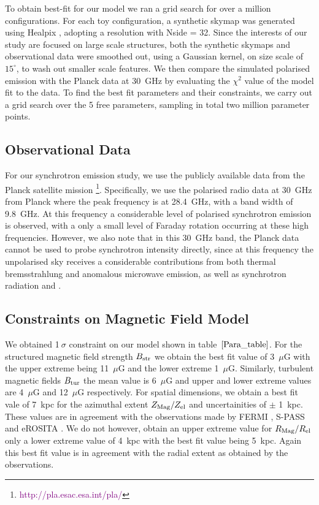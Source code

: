 \documentclass[usenatbib]{mnras}
\begin{document}

To obtain best-fit for our model we ran a grid search for over a million configurations. For each toy configuration, a synthetic skymap was generated using Healpix \cite{Healpix_2005}, adopting a resolution with Nside = 32. Since the interests of our study are focused on large scale structures, both the synthetic skymaps and observational data were smoothed out, using a Gaussian kernel, on size scale of $15^{\circ}$, to wash out smaller scale features. We then compare the simulated polarised emission with the Planck data at 30~GHz by evaluating the $\chi^{2}$ value of the model fit to the data. To find the best fit parameters and their constraints, we carry out a grid search over the 5 free parameters, sampling in total two million parameter points.


\subsection{Observational Data}
For our synchrotron emission study, we use the publicly available data from the Planck satellite mission \footnote{\textcolor{purple}{http://pla.esac.esa.int/pla/}}. Specifically, we use the polarised radio data at 30~GHz from Planck where the peak frequency is at 28.4~GHz, with a band width of 9.8~GHz. At this frequency a considerable level of polarised synchrotron emission is observed, with a only a small level of Faraday rotation occurring at these high frequencies. However, we also note that in this 30~GHz band, the Planck data cannot be used to probe synchrotron intensity directly, since at this frequency the unpolarised sky receives a considerable contributions from both thermal bremsstrahlung and anomalous microwave emission, as well as synchrotron radiation \cite{Planck_XIX} and \cite{Planck_XLII}. 

\subsection{Constraints on Magnetic Field Model}
\label{Results}
We obtained 1$~\sigma$ constraint on our model shown in table~$\ref{Para_table}$. For the structured magnetic field strength $B_{\rm str}$ we obtain the best fit value of 3~$\mu$G with the upper extreme being 11~$\mu$G
and the lower extreme 1~$\mu$G. Similarly, turbulent magnetic fields $B_{\rm tur}$ the mean value is 6~$\mu$G and upper and lower extreme values are 4~$\mu$G and 12~$\mu$G respectively. For spatial dimensions, we obtain a best fit vale of 7~kpc for the azimuthal extent $Z_{\rm Mag}/Z_{\rm el}$ and uncertainities of $\pm$ 1~kpc. These values are in agreement with the observations made by FERMI \cite{Su_2010}, S-PASS \cite{Carretti_2013} and eROSITA \cite{eROSITA}. We do not however, obtain an upper extreme value for $R_{\rm Mag}/R_{\rm el}$ only a lower extreme value of 4~kpc with the best fit value being 5~kpc. Again this best fit value is in agreement with the radial extent as obtained by the observations.
\end{document}
